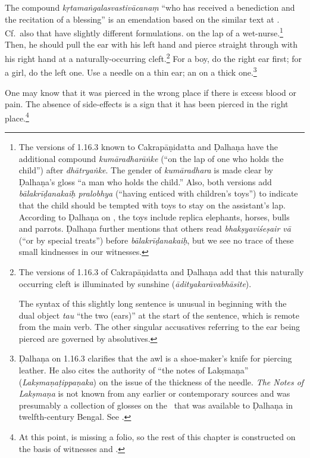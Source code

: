 \begin{translation}
{The compound \emph{kṛtamaṅgalasvastivācanaṃ} “who has received a benediction and
the recitation of a blessing” is an emendation based on the similar text at
.  Cf.\ also  that have slightly
different formulations.} on the lap of a wet-nurse.\footnote{The versions of
    1.16.3 known to Cakrapāṇidatta \citep[126]{acar-1939} and Ḍalhaṇa
    \citep[76]{vulgate} have the additional compound \emph{kumāradharāṅke} (“on the
    lap of one who holds the child”) after \emph{dhātryaṅke}. The gender of
    \emph{kumāradhara} is made clear by  Ḍalhaṇa's gloss “a man who holds the child.”
    Also, both versions add \emph{bālakrīḍanakaiḥ pralobhya} (“having enticed with
    children's toys”) to indicate that the child should be tempted with toys to stay
    on the assistant's lap. According to Ḍalhaṇa on , the toys include
    replica elephants, horses, bulls and parrots. Ḍalhaṇa further mentions that others
    read \emph{bhakṣyaviśeṣair vā} (“or by special treats”) before
    \emph{bālakrīḍanakaiḥ}, but we see no trace of these small kindnesses in our
    witnesses.} Then, he should pull the ear with his left hand 
    and pierce straight through with his right hand at a naturally-occurring
    cleft.\footnote{The versions of 1.16.3 of Cakrapāṇidatta \citep[126]{acar-1939}
        and Ḍalhaṇa \citep[76]{vulgate} add that this naturally occurring cleft is
        illuminated by sunshine  (\emph{ādityakarāvabhāsite}).

The syntax of this slightly long sentence is unusual in beginning with the dual
object \emph{tau} “the two (ears)” at the start of the sentence, which is remote
from the main verb.  The other singular accusatives referring to the ear being
pierced are governed by absolutives.} For a boy, do the right ear first; for a
girl, do the left one. Use a needle on a thin ear; an  on a thick
one.\footnote{Ḍalhaṇa on 1.16.3 \citep[76]{vulgate} clarifies that the awl is a
    shoe-maker's knife for piercing leather.    He also cites the authority of “the
    notes of Lakṣmaṇa” (\emph{Lakṣmaṇaṭippaṇaka}) on the issue of the thickness of the
    needle. \textit{The Notes of Lakṣmaṇa} is not known from any earlier or
    contemporary sources and was presumably a collection of glosses on the \SS\ that
    was available to Ḍalhaṇa in twelfth-century Bengal. See \citet[IA,
    386]{meul-hist}.}
    
    \item [3]  One may know that it was pierced in the wrong place if there is
excess blood or pain. The absence of side-effects is a sign that it has been
pierced in the right place.\footnote{At this point, 
    is missing a folio, so the rest of this chapter is constructed on the basis of
    witnesses  and .}
    

\end{translation}
